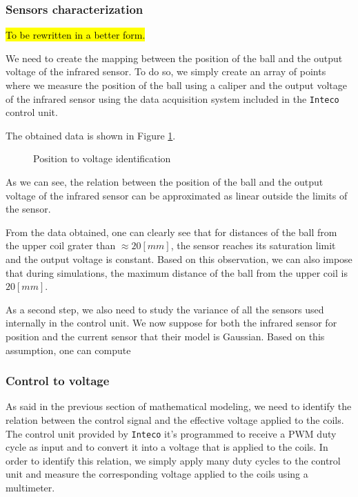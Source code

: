 \subsubsection{Sensors characterization}
\label{subsubsec:sensors_characterization}

\hl{To be rewritten in a better form.}

We need to create the mapping between the position of the ball and the output voltage of the infrared sensor.
To do so, we simply create an array of points where we measure the position of the ball using a caliper and the output voltage of the infrared sensor using the data acquisition system included in the \texttt{Inteco} control unit.

The obtained data is shown in Figure \ref{fig:position_to_voltage}.

\begin{figure}[H]
    \centering
    \caption{Position to voltage identification}
    \label{fig:position_to_voltage}
\end{figure}

As we can see, the relation between the position of the ball and the output voltage of the infrared sensor can be approximated as linear outside the limits of the sensor.

From the data obtained, one can clearly see that for distances of the ball from the upper coil grater than $\approx 20 [mm]$, the sensor reaches its saturation limit and the output voltage is constant.
Based on this observation, we can also impose that during simulations, the maximum distance of the ball from the upper coil is $20 [mm]$.

As a second step, we also need to study the variance of all the sensors used internally in the control unit.
We now suppose for both the infrared sensor for position and the current sensor that their model is Gaussian.
Based on this assumption, one can compute



\subsubsection{Control to voltage}
\label{subsubsec:control_to_voltage}

As said in the previous section of mathematical modeling, we need to identify the relation between the control signal and the effective voltage applied to the coils.
The control unit provided by \texttt{Inteco} it's programmed to receive a PWM duty cycle as input and to convert it into a voltage that is applied to the coils.
In order to identify this relation, we simply apply many duty cycles to the control unit and measure the corresponding voltage applied to the coils using a multimeter.

